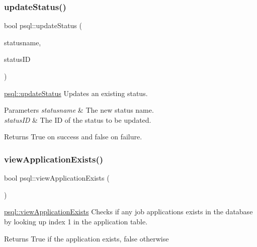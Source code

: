 \subsubsection{\texorpdfstring{update\+Status()}{updateStatus()}}
{\footnotesize\ttfamily bool psql\+::update\+Status (\begin{DoxyParamCaption}\item[{Q\+String}]{statusname,  }\item[{int}]{status\+ID }\end{DoxyParamCaption})}



\hyperlink{classpsql_a620364c99c98e20720908deb045536a0}{psql\+::update\+Status} Updates an existing status. 


\begin{DoxyParams}{Parameters}
{\em statusname} & The new status name. \\
\hline
{\em status\+ID} & The ID of the status to be updated. \\
\hline
\end{DoxyParams}
\begin{DoxyReturn}{Returns}
True on success and false on failure. 
\end{DoxyReturn}
\mbox{\label{classpsql_a4c23d467c41e155a55c38b1cefb9b54b}} 
\subsubsection{\texorpdfstring{view\+Application\+Exists()}{viewApplicationExists()}}
{\footnotesize\ttfamily bool psql\+::view\+Application\+Exists (\begin{DoxyParamCaption}{ }\end{DoxyParamCaption})}



\hyperlink{classpsql_a4c23d467c41e155a55c38b1cefb9b54b}{psql\+::view\+Application\+Exists} Checks if any job applications exists in the database by looking up index 1 in the application table. 

\begin{DoxyReturn}{Returns}
True if the application exists, false otherwise 
\end{DoxyReturn}
\mbox{\label{classpsql_aae95eb2a505c1b0b7b4d5671926ecd2f}} 
